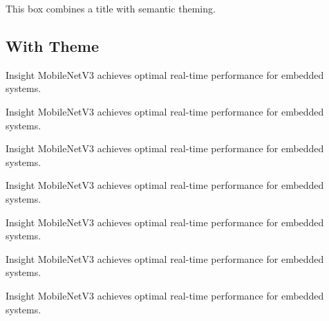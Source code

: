 \documentclass[12pt,onecolumn]{article}
\begin{document}
    \begin{ktbox}[theme=gray]
\begin{codeblock}
  \begin{ktbox}[title={Model Insight}, theme=green]
  This box combines a title with semantic theming.
  \end{ktbox}
\end{codeblock}
    \end{ktbox}


  \subsection{With Theme}
  \label{with-theme}
    \vspace*{0.75em}

    \begin{ktboxnumbered}[theme=red]{Insight}
      MobileNetV3 achieves optimal real-time performance for embedded systems.
    \end{ktboxnumbered}

    \begin{ktboxnumbered}[theme=orange]{Insight}
      MobileNetV3 achieves optimal real-time performance for embedded systems.
    \end{ktboxnumbered}

    \begin{ktboxnumbered}[theme=green]{Insight}
      MobileNetV3 achieves optimal real-time performance for embedded systems.
    \end{ktboxnumbered}

    \begin{ktboxnumbered}[theme=yellow]{Insight}
      MobileNetV3 achieves optimal real-time performance for embedded systems.
    \end{ktboxnumbered}

    \begin{ktboxnumbered}[theme=blue]{Insight}
      MobileNetV3 achieves optimal real-time performance for embedded systems.
    \end{ktboxnumbered}

    \begin{ktboxnumbered}[theme=cyan]{Insight}
      MobileNetV3 achieves optimal real-time performance for embedded systems.
    \end{ktboxnumbered}

    \begin{ktboxnumbered}[theme=purple]{Insight}
      MobileNetV3 achieves optimal real-time performance for embedded systems.
    \end{ktboxnumbered}
\end{document}
